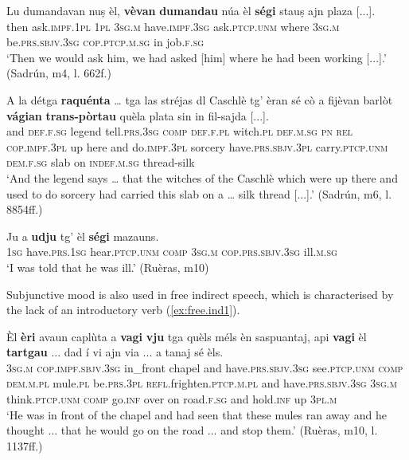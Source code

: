 \ea
\label{ex:subj2}
\gll Lu dumandavan nuṣ èl, \textbf{vèvan} \textbf{dumandau} núa èl \textbf{ségi} stauṣ ajn plaza [...].\\
then ask.\textsc{impf.1pl} \textsc{1pl} \textsc{3sg.m} have.\textsc{impf.3sg}  ask.\textsc{ptcp.unm} where \textsc{3sg.m} be.\textsc{prs.sbjv.3sg} \textsc{cop.ptcp.m.sg} in job.\textsc{f.sg}\\
\glt `Then we would ask him, we had asked [him] where he had been working [...].' (Sadrún, m4, l. 662f.)
\z

\ea
\label{ex:subj3}
\gll    A la détga \textbf{raquénta} … tga las stréjas dl Caschlè tg’ èran sé cò a fijèvan barlòt \textbf{vágian} \textbf{trans-pòrtau} quèla plata sin\footnotemark{} in fil-sajda [...].\\
and \textsc{def.f.sg} legend tell.\textsc{prs.3sg} {} \textsc{comp} \textsc{def.f.pl} witch.\textsc{pl} \textsc{def.m.sg} \textsc{pn} \textsc{rel} \textsc{cop.impf.3pl} up here and do.\textsc{impf.3pl} sorcery have.\textsc{prs.sbjv.3pl} carry.\textsc{ptcp.unm} \textsc{dem.f.sg} slab on \textsc{indef.m.sg} thread-silk\\
\glt `And the legend says … that the witches of the Caschlè which were up there and used to do sorcery had carried this slab on a … silk thread [...].' (Sadrún, m6, l. 8854ff.)
\z

\ea
\label{ex:subj4}
\gll Ju a \textbf{udju} tg' èl \textbf{ségi} mazauns.\\
\textsc{1sg} have.\textsc{prs.1sg} hear.\textsc{ptcp.unm} \textsc{comp} \textsc{3sg.m} \textsc{cop.prs.sbjv.3sg} ill.\textsc{m.sg}\\
\glt `I was told that he was ill.' (Ruèras, m10)
\z

Subjunctive mood is also used in free indirect speech, which is characterised by the lack of an introductory verb (\ref{ex:free.ind1}).

\ea
\label{ex:free.ind1}
\gll  Èl \textbf{èri} avaun caplùta a \textbf{vagi} \textbf{vju} tga quèls méls èn saspuantaj, api \textbf{vagi} èl \textbf{tartgau} ... dad í vi ajn via ... a tanaj sé èls.  \\
\textsc{3sg.m} \textsc{cop.impf.sbjv.3sg} in\_front chapel and have.\textsc{prs.sbjv.3sg} see.\textsc{ptcp.unm} \textsc{comp} \textsc{dem.m.pl} mule.\textsc{pl} be.\textsc{prs.3pl} \textsc{refl.}frighten.\textsc{ptcp.m.pl} and have.\textsc{prs.sbjv.3sg} \textsc{3sg.m} think.\textsc{ptcp.unm} {} \textsc{comp} go.\textsc{inf} over on road.\textsc{f.sg} {} and hold.\textsc{inf} up \textsc{3pl.m}\\
\glt `He was in front of the chapel and had seen that these mules ran away and he thought ... that he would go on the road ... and stop them.' (Ruèras, m10, l. 1137ff.)
\z

